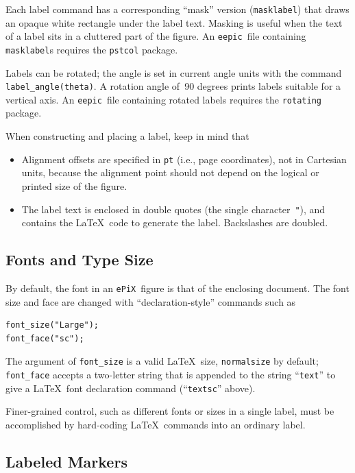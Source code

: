 \documentclass[12pt]{report}
\newcommand{\code}[1]{\texttt{#1}}
\newcommand{\ePiX}{\code{ePiX}}
\newcommand{\eepic}{\code{eepic}}
\begin{document}
Each label command has a corresponding ``mask'' version
(\code{masklabel}) that draws an opaque white rectangle under the
label text. Masking is useful when the text of a label sits in a
cluttered part of the figure. An \eepic\ file containing
\code{masklabel}s requires the \code{pstcol} package.

Labels can be rotated; the angle is set in current angle units with
the command \code{label\_angle(theta)}. A rotation angle
of~90 degrees prints labels suitable for a vertical axis.  An
\eepic\ file containing rotated labels requires the \code{rotating}
package.

When constructing and placing a label, keep in
mind that
\begin{itemize}
\item Alignment offsets are specified in \code{pt} (i.e., page
  coordinates), not in Cartesian units, because the alignment point
  should not depend on the logical or printed size of the figure.

\item The label text is enclosed in double quotes (the single
  character~\code{"}), and contains the \LaTeX\ code to generate the
  label. Backslashes are doubled.
\end{itemize}


\subsection*{Fonts and Type Size}

By default, the font in an \ePiX\ figure is that of the enclosing
document. The font size and face are changed with
``declaration-style'' commands such as
\begin{verbatim}
font_size("Large");
font_face("sc");
\end{verbatim}
The argument of \verb+font_size+ is a valid \LaTeX\ size,
\code{normalsize} by default; \verb+font_face+ accepts a two-letter
string that is appended to the string ``\code{text}'' to give a
\LaTeX\ font declaration command (``\code{textsc}'' above).

Finer-grained control, such as different fonts or sizes in a single
label, must be accomplished by hard-coding \LaTeX\ commands into an
ordinary label.


\subsection*{Labeled Markers}
\end{document}
